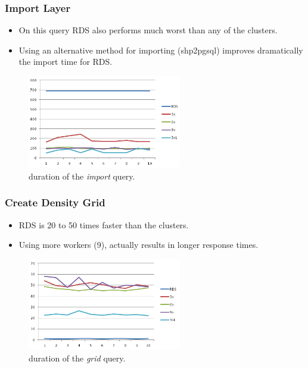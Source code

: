 \documentclass[hyperref={pdfpagelabels=true}]{beamer}
\begin{document}
\begin{frame}
\frametitle{Import Layer}
  \begin{itemize}    
    \item<2->On this query RDS also performs much worst than any of the clusters.%
    \item<3->Using an alternative method for importing (shp2pgsql) improves dramatically the import time for RDS.%
  \end{itemize} 
    \begin{figure}       
	\includegraphics[width=0.6\textwidth]{import.png}      
	\caption{\tiny{duration of the \textit{import} query.}}
     \end{figure} 
\end{frame}

\begin{frame}
\frametitle{Create Density Grid}
  \begin{itemize}    
    \item<2->RDS is 20 to 50 times faster than the clusters.%
    \item<3->Using more workers (9), actually results in longer response times.
  \end{itemize} 
    \begin{figure}       
	\includegraphics[width=0.6\textwidth]{grid.png}      
	\caption{\tiny{duration of the \textit{grid} query.}}
     \end{figure} 
\end{frame}
\end{document}
